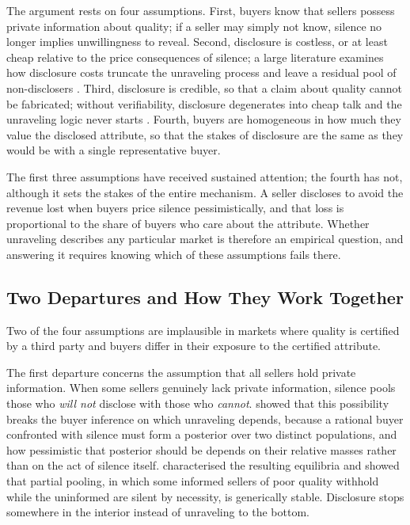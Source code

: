 The argument rests on four assumptions. First, buyers know
that sellers possess private information about quality; if a seller may simply not know, silence
no longer implies unwillingness to reveal. Second, disclosure is costless, or at least cheap
relative to the price consequences of silence; a large literature examines how disclosure costs
truncate the unraveling process and leave a residual pool of non-disclosers
\citep{verrecchia_1983, jovanovic_1982}. Third, disclosure is credible, so that a claim about
quality cannot be fabricated; without verifiability, disclosure degenerates into cheap talk and
the unraveling logic never starts \citep{crawford_sobel_1982, stocken_credibility_2000}. Fourth, buyers are homogeneous in how much they value the
disclosed attribute, so that the stakes of disclosure are the same as they would be with a single representative
buyer.

The first three assumptions have received sustained attention; the fourth has not, although
it sets the stakes of the entire mechanism. A seller discloses to avoid the revenue
lost when buyers price silence pessimistically, and that loss is proportional to the share of
buyers who care about the attribute. Whether unraveling describes any
particular market is therefore an empirical question, and answering it requires knowing which of
these assumptions fails there.

\subsection{Two Departures and How They Work Together}

Two of the four assumptions are implausible in markets where quality is certified by a
third party and buyers differ in their exposure to the certified attribute.

The first departure concerns the assumption that all sellers hold private information. When some sellers genuinely lack private
information, silence pools those who \emph{will not} disclose with those who \emph{cannot}.
\citet{dye_disclosure_1985} showed that this possibility breaks the buyer inference on which
unraveling depends, because a rational buyer confronted with silence must form a posterior over two
distinct populations, and how pessimistic that posterior should be depends on their relative
masses rather than on the act of silence itself. \citet{jung_kwon_1988} characterised the
resulting equilibria and showed that partial pooling, in which some informed sellers of poor
quality withhold while the uninformed are silent by necessity, is generically stable. Disclosure
stops somewhere in the interior instead of unraveling to the bottom.

